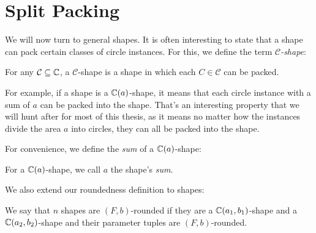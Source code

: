 \documentclass[a4paper,style=print,bibliography=totoc,nexus,lnum,extramargin]{tubsbook}
\begin{document}

\section{Split Packing}

We will now turn to general shapes. It is often interesting to state that a shape can pack certain classes of circle instances. For this, we define the term \emph{$\mathcal{C}$-shape}:

\begin{definition}
    For any $\mathcal{C} \subseteq \mathbb{C}$, a $\mathcal{C}$-shape is a shape in which each $C \in \mathcal{C}$ can be packed.
\end{definition}

For example, if a shape is a $\mathbb{C}(a)$-shape, it means that each circle instance with a sum of $a$ can be packed into the shape. That's an interesting property that we will hunt after for most of this thesis, as it means no matter how the instances divide the area $a$ into circles, they can all be packed into the shape.

For convenience, we define the \emph{sum} of a $\mathbb{C}(a)$-shape:

\begin{definition}
    For a $\mathbb{C}(a)$-shape, we call $a$ the shape's \emph{sum}.
\end{definition}

We also extend our roundedness definition to shapes:

\begin{definition}
    We say that $n$ shapes are $(F,b)$-rounded if they are a $\mathbb{C}(a_1, b_1)$-shape and a $\mathbb{C}(a_2, b_2)$-shape and their parameter tuples are $(F,b)$-rounded.
\end{definition}

\end{document}
